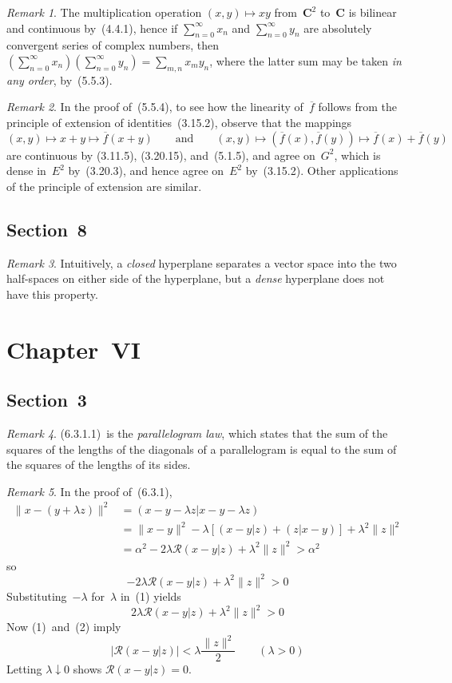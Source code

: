 \documentclass[letterpaper,12pt]{article}
\newcommand{\C}{\mathbf{C}}
\renewcommand{\Re}{\mathcal{R}}
\newcommand{\downto}{\downarrow}
\newcommand{\closure}[1]{\overline{#1}}
\newcommand{\abs}[1]{|{#1}|}
\newcommand{\norm}[1]{\lVert{#1}\rVert}
\newcommand{\innerprod}[2]{({#1}|{#2})}
\theoremstyle{plain}
\theoremstyle{definition}
\theoremstyle{remark}
\newtheorem*{rmk}{Remark}
\begin{document}
\begin{rmk}
The multiplication operation \((x,y)\mapsto xy\) from~\(\C^2\) to~\(\C\) is bilinear and continuous by~(4.4.1), hence if \(\sum_{n=0}^{\infty}x_n\) and \(\sum_{n=0}^{\infty}y_n\) are absolutely convergent series of complex numbers, then \((\sum_{n=0}^{\infty}x_n)(\sum_{n=0}^{\infty}y_n)=\sum_{m,n}x_my_n\), where the latter sum may be taken \emph{in any order}, by~(5.5.3).
\end{rmk}

\begin{rmk}
In the proof of~(5.5.4), to see how the linearity of~\(\closure{f}\) follows from the principle of extension of identities~(3.15.2), observe that the mappings
\[(x,y)\mapsto x+y\mapsto\closure{f}(x+y)\qquad\text{and}\qquad(x,y)\mapsto(\closure{f}(x),\closure{f}(y))\mapsto\closure{f}(x)+\closure{f}(y)\]
are continuous by (3.11.5), (3.20.15), and~(5.1.5), and agree on~\(G^2\), which is dense in~\(E^2\) by~(3.20.3), and hence agree on~\(E^2\) by~(3.15.2). Other applications of the principle of extension are similar.
\end{rmk}

\subsection*{Section~8}
\begin{rmk}
Intuitively, a \emph{closed} hyperplane separates a vector space into the two half-spaces on either side of the hyperplane, but a \emph{dense} hyperplane does not have this property.
\end{rmk}

\section*{Chapter~VI}
\subsection*{Section~3}
\begin{rmk}
(6.3.1.1)~is the \emph{parallelogram law}, which states that the sum of the squares of the lengths of the diagonals of a parallelogram is equal to the sum of the squares of the lengths of its sides.
\end{rmk}

\begin{rmk}
In the proof of~(6.3.1),
\begin{align*}
\norm{x-(y+\lambda z)}^2&=\innerprod{x-y-\lambda z}{x-y-\lambda z}\\
	&=\norm{x-y}^2-\lambda[\innerprod{x-y}{z}+\innerprod{z}{x-y}]+\lambda^2\norm{z}^2\\
	&=\alpha^2-2\lambda\Re\innerprod{x-y}{z}+\lambda^2\norm{z}^2>\alpha^2
\end{align*}
so
\[-2\lambda\Re\innerprod{x-y}{z}+\lambda^2\norm{z}^2>0\tag{1}\]
Substituting~\(-\lambda\) for~\(\lambda\) in~(1) yields
\[2\lambda\Re\innerprod{x-y}{z}+\lambda^2\norm{z}^2>0\tag{2}\]
Now (1)~and~(2) imply
\[\abs{\Re\innerprod{x-y}{z}}<\lambda\frac{\norm{z}^2}{2}\qquad(\lambda>0)\]
Letting \(\lambda\downto 0\) shows \(\Re\innerprod{x-y}{z}=0\).
\end{rmk}
\end{document}
